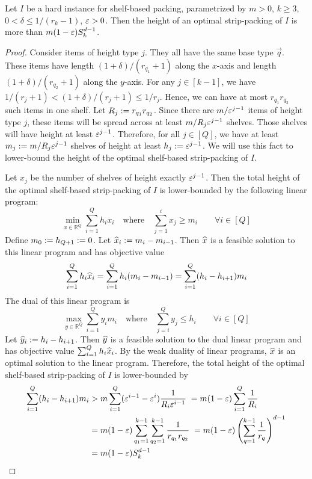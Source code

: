 \begin{theorem}
Let $I$ be a hard instance for shelf-based packing, parametrized by
$m > 0$, $k \ge 3$, $0 < \delta \le 1/(r_k-1)$, $\varepsilon > 0$.
Then the height of an optimal strip-packing of $I$ is more than $m(1-\varepsilon)S_k^{d-1}$.
\end{theorem}
\begin{proof}
Consider items of height type $j$. They all have the same base type $\vec{q}$.
These items have length $(1+\delta)/(r_{q_1}+1)$ along the $x$-axis
and length $(1+\delta)/(r_{q_2}+1)$ along the $y$-axis.
For any $j \in [k-1]$, we have $1/(r_j+1) < (1+\delta)/(r_j+1) \le 1/r_j$.
Hence, we can have at most $r_{q_1} r_{q_2}$ such items in one shelf.
Let $R_j := r_{q_1} r_{q_2}$.
Since there are $m/\varepsilon^{j-1}$ items of height type $j$,
these items will be spread across at least $m/R_j\varepsilon^{j-1}$ shelves.
Those shelves will have height at least $\varepsilon^{j-1}$. Therefore, for all $j \in [Q]$,
we have at least $m_j := m/R_j\varepsilon^{j-1}$ shelves of height at least $h_j := \varepsilon^{j-1}$.
We will use this fact to lower-bound the height of the optimal shelf-based strip-packing of $I$.

Let $x_j$ be the number of shelves of height exactly $\varepsilon^{j-1}$.
Then the total height of the optimal shelf-based strip-packing of $I$ is
lower-bounded by the following linear program:
\[ \min_{x \in \mathbb{R}^Q} \sum_{i=1}^Q h_ix_i
\quad \textrm{where} \quad \sum_{j=1}^i x_j \ge m_i \qquad \forall i \in [Q] \]
Define $m_0 := h_{Q+1} := 0$. Let $\widehat{x}_i := m_i - m_{i-1}$.
Then $\widehat{x}$ is a feasible solution to this linear program and has objective value
\[ \sum_{i=1}^Q h_i\widehat{x}_i
= \sum_{i=1}^Q h_i(m_i - m_{i-1})
= \sum_{i=1}^Q (h_i - h_{i+1})m_i \]
The dual of this linear program is
\[ \max_{y \in \mathbb{R}^Q} \sum_{i=1}^Q y_im_i
\quad \textrm{where} \quad \sum_{j=i}^Q y_j \le h_i \qquad \forall i \in [Q] \]
Let $\widehat{y}_i := h_i - h_{i+1}$.
Then $\widehat{y}$ is a feasible solution to the dual linear program
and has objective value $\sum_{i=1}^Q h_i\widehat{x}_i$.
By the weak duality of linear programs, $\widehat{x}$ is an optimal solution to the linear program.
Therefore, the total height of the optimal shelf-based strip-packing of $I$ is
lower-bounded by
\begin{align*}
\sum_{i=1}^Q (h_i - h_{i+1})m_i
&> m \sum_{i=1}^Q (\varepsilon^{i-1} - \varepsilon^i) \frac{1}{R_i\varepsilon^{i-1}}
\; = m(1-\varepsilon) \sum_{i=1}^Q \frac{1}{R_i}
\\ &= m(1-\varepsilon) \sum_{q_1=1}^{k-1} \sum_{q_2=1}^{k-1} \frac{1}{r_{q_1}r_{q_2}}
\; = m(1-\varepsilon) \left(\sum_{q=1}^{k-1} \frac{1}{r_q}\right)^{d-1}
\\ &= m(1-\varepsilon) S_k^{d-1}
\qedhere \end{align*}
\end{proof}
